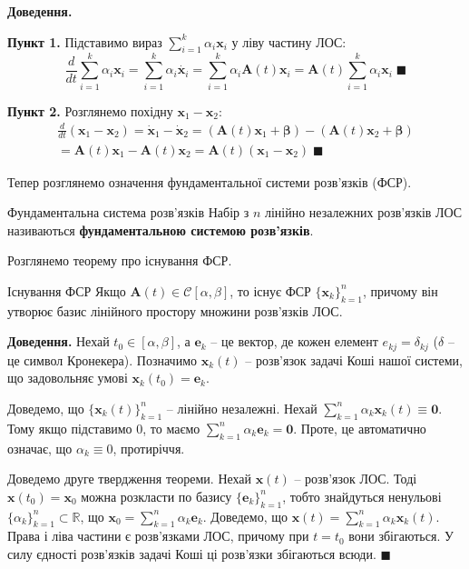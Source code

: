 \documentclass[14pt]{extarticle}
\begin{document}
\textbf{Доведення.}

\textbf{Пункт 1.} Підставимо вираз $\sum_{i=1}^k \alpha_i\mathbf{x}_i$ у ліву частину ЛОС:
\[
\frac{d}{dt}\sum_{i=1}^k \alpha_i\mathbf{x}_i= \sum_{i=1}^k \alpha_i\dot{\mathbf{x}_i} = \sum_{i=1}^k \alpha_i\mathbf{A}(t)\mathbf{x}_i = \mathbf{A}(t)\sum_{i=1}^k \alpha_i\mathbf{x}_i \; \blacksquare
\]

\textbf{Пункт 2.} Розглянемо похідну $\mathbf{x}_1-\mathbf{x}_2$:
\begin{gather*}
\frac{d}{dt}(\mathbf{x}_1-\mathbf{x}_2) = \dot{\mathbf{x}}_1-\dot{\mathbf{x}}_2 = (\mathbf{A}(t)\mathbf{x}_1 + \boldsymbol{\beta}) - (\mathbf{A}(t)\mathbf{x}_2 + \boldsymbol{\beta}) \\
= \mathbf{A}(t)\mathbf{x}_1 - \mathbf{A}(t)\mathbf{x}_2 = \mathbf{A}(t)(\mathbf{x}_1-\mathbf{x}_2) \; \blacksquare
\end{gather*}

Тепер розглянемо означення фундаментальної системи розв'язків (ФСР).

\begin{def*}{Фундаментальна система розв'язків}
    Набір з $n$ лінійно незалежних розв'язків ЛОС називаються \textbf{фундаментальною системою розв'язків}. 
\end{def*}

Розглянемо теорему про існування ФСР.

\begin{theorem*}{Існування ФСР}
    Якщо $\mathbf{A}(t) \in \mathcal{C}[\alpha,\beta]$, то існує ФСР $\{\mathbf{x}_k\}_{k=1}^n$, причому він утворює базис лінійного простору множини розв'язків ЛОС.
\end{theorem*}

\textbf{Доведення.} Нехай $t_0 \in [\alpha,\beta]$, а $\mathbf{e}_k$ -- це вектор, де кожен елемент $e_{kj}=\delta_{kj}$ ($\delta$ -- це символ Кронекера). Позначимо $\mathbf{x}_k(t)$ -- розв'язок задачі Коші нашої системи, що задовольняє умові $\mathbf{x}_k(t_0)=\mathbf{e}_k$. 

Доведемо, що $\{\mathbf{x}_k(t)\}_{k=1}^n$ -- лінійно незалежні. Нехай $\sum_{k=1}^n \alpha_k\mathbf{x}_k(t) \equiv \mathbf{0}$. Тому якщо підставимо $0$, то маємо $\sum_{k=1}^n\alpha_k\mathbf{e}_k=\mathbf{0}$. Проте, це автоматично означає, що $\alpha_k\equiv 0$, протиріччя.

Доведемо друге твердження теореми. Нехай $\mathbf{x}(t)$ -- розв'язок ЛОС. Тоді $\mathbf{x}(t_0)=\mathbf{x}_0$ можна розкласти по базису $\{\mathbf{e}_k\}_{k=1}^n$, тобто знайдуться ненульові $\{\alpha_k\}_{k=1}^n \subset \mathbb{R}$, що $\mathbf{x}_0=\sum_{k=1}^n \alpha_k\mathbf{e}_k$. Доведемо, що $\mathbf{x}(t)=\sum_{k=1}^n \alpha_k\mathbf{x}_k(t)$. Права і ліва частини є розв'язками ЛОС, причому при $t=t_0$ вони збігаються. У силу єдності розв'язків задачі Коші ці розв'язки збігаються всюди. $\blacksquare$
\end{document}
